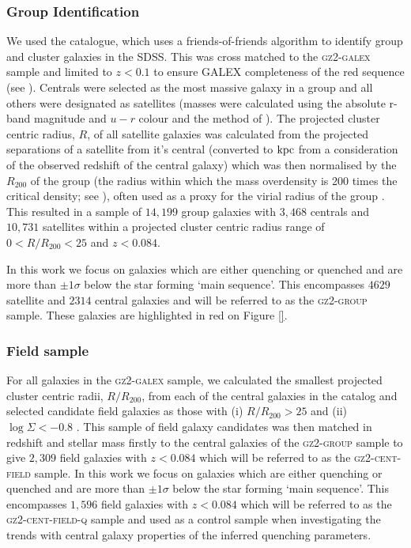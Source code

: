 \documentclass[useAMS,usenatbib]{mn2e}
\begin{document}
\subsubsection{Group Identification}\label{sec:groups}



We used the \citet{berlind06} catalogue, which uses a friends-of-friends algorithm to identify group and cluster galaxies in the SDSS. This was cross matched to the \textsc{gz2-galex} sample and limited to $z < 0.1$ to ensure GALEX completeness of the red sequence (see \citealt{wyder07, yesuf14}). Centrals were selected as the most massive galaxy in a group and all others were designated as satellites (masses were calculated using the absolute r-band magnitude and $u-r$ colour and the method of \citealt{baldry06}).  The projected cluster centric radius, $R$, of all satellite galaxies was calculated from the projected separations of a satellite from it's central (converted to $\rm{kpc}$ from a consideration of the observed redshift of the central galaxy) which was then normalised by the $R_{200}$ of the group (the radius within which the mass overdensity is 200 times the critical density; see \citealt{?}), often used as a proxy for the virial radius of the group \citep{?}. This resulted in a sample of $14,199$ group galaxies with $3,468$ centrals and $10,731$ satellites within a projected cluster centric radius range of $0 < R/R_{200} < 25$ and $z < 0.084$. 

In this work we focus on galaxies which are either quenching or quenched and are more than $\pm1\sigma$ below the star forming `main sequence'. This encompasses $4629$ satellite and $2314$ central galaxies and will be referred to as the \textsc{gz2-group} sample. These galaxies are highlighted in red on Figure \ref{}. 

\subsubsection{Field sample}\label{sec:field}

For all galaxies in the \textsc{gz2-galex} sample, we calculated the smallest projected cluster centric radii, $R/R_{200}$, from each of the central galaxies in the  \citet{berlind06} catalog and selected candidate field galaxies as those with (i) $R/R_{200} > 25$ and (ii) $\log\Sigma < -0.8$ \citep[a measure of environmental density from][]{baldry06}. This sample of field galaxy candidates was then matched in redshift and stellar mass firstly to the central galaxies of the \textsc{gz2-group} sample to give $2,309$ field galaxies with $z < 0.084$ which will be referred to as the \textsc{gz2-cent-field} sample. In this work we focus on galaxies which are either quenching or quenched and are more than $\pm1\sigma$ below the star forming `main sequence'. This encompasses $1,596$ field galaxies with $z < 0.084$ which will be referred to as the \textsc{gz2-cent-field-q} sample and used as a control sample when investigating the trends with central galaxy properties of the inferred quenching parameters. %
\end{document}
